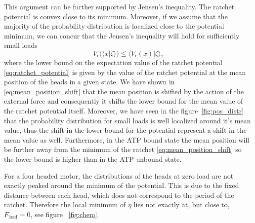 \documentclass[aps,pre,twocolumn,showpacs,showkeys,superscriptaddress,floatfix]{revtex4-1}
\begin{document}
This argument can be further supported by Jensen's inequality.
The ratchet potential is convex close to its minimum. 
Moreover, if we assume that the majority of the probability distribution is localized close to the potential minimum,
we can concur that the Jensen's inequality will hold for sufficiently small loads  
\begin{equation*}
V_\text{r}(\langle x | \zeta \rangle) \leq \langle V_\text{r}(x) | \zeta \rangle , 
\end{equation*} 
where the lower bound on the expectation value of the ratchet potential \eqref{eq:ratchet_potential} is given by the value of the ratchet potential at the mean position of the heads in a given state. 
We have shown in \eqref{eq:mean_position_shift} that the mean position is shifted by the action of the external force and consequently it shifts the lower bound for the mean value of the ratchet potential itself. 
Moreover, we have seen in the figure~\ref{fig:pos_distr} that the probability distribution for small loads is well localized around it's mean value,
thus the shift in the lower bound for the potential represent a shift in the mean value as well. 
Furthermore, in the ATP bound state the mean position will be further away from the minimum of the ratchet \eqref{eq:mean_position_shift} so the lower bound is higher than in the ATP unbound state.

For a four headed motor, the distributions of the heads at zero load are not exactly peaked around the minimum of the potential. 
This is due to the fixed distance between each head, which does not correspond to the period of the ratchet. 
Therefore the local minimum of $\eta$ lies not exactly at, but close to, $F_\text{load} =0$, see figure ~\ref{fig:chem}.
\end{document}
